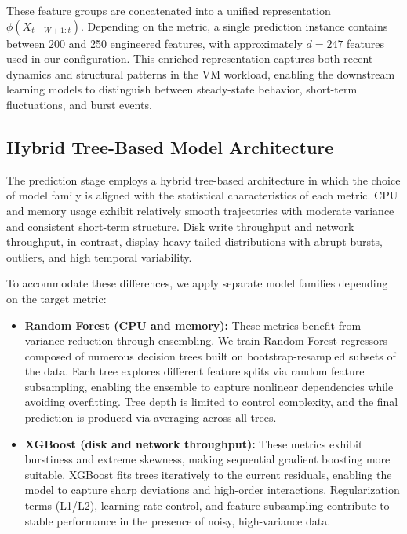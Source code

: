\documentclass[a4paper,fleqn]{cas-dc}
\begin{document}
These feature groups are concatenated into a unified representation $\phi(X_{t-W+1:t})$. Depending on the metric, a single prediction instance contains between 200 and 250 engineered features, with approximately $d=247$ features used in our configuration. This enriched representation captures both recent dynamics and structural patterns in the VM workload, enabling the downstream learning models to distinguish between steady-state behavior, short-term fluctuations, and burst events.

\subsection{Hybrid Tree-Based Model Architecture}
\label{subsec:hybrid_architecture}

The prediction stage employs a hybrid tree-based architecture in which the choice of model family is aligned with the statistical characteristics of each metric. CPU and memory usage exhibit relatively smooth trajectories with moderate variance and consistent short-term structure. Disk write throughput and network throughput, in contrast, display heavy-tailed distributions with abrupt bursts, outliers, and high temporal variability.

To accommodate these differences, we apply separate model families depending on the target metric:

\begin{itemize}
    \item \textbf{Random Forest (CPU and memory):}
    These metrics benefit from variance reduction through ensembling. We train Random Forest regressors composed of numerous decision trees built on bootstrap-resampled subsets of the data. Each tree explores different feature splits via random feature subsampling, enabling the ensemble to capture nonlinear dependencies while avoiding overfitting. Tree depth is limited to control complexity, and the final prediction is produced via averaging across all trees.

    \item \textbf{XGBoost (disk and network throughput):}
    These metrics exhibit burstiness and extreme skewness, making sequential gradient boosting more suitable. XGBoost fits trees iteratively to the current residuals, enabling the model to capture sharp deviations and high-order interactions. Regularization terms (L1/L2), learning rate control, and feature subsampling contribute to stable performance in the presence of noisy, high-variance data.
\end{itemize}
\end{document}
